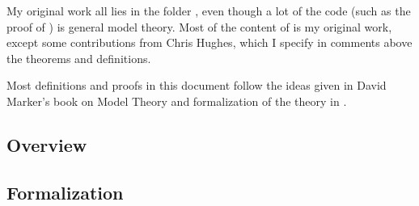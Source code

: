 My original work all lies in the folder ,
even though a lot of the code (such as the proof of )
is general model theory.
Most of the content of  is my original work,
except some contributions from Chris Hughes,
which I specify in comments above the theorems and definitions.

Most definitions and proofs in this document follow the ideas given in
David Marker's book on Model Theory \cite{marker} and formalization of the theory in .

\subsection*{Overview}



\subsection*{Formalization}





